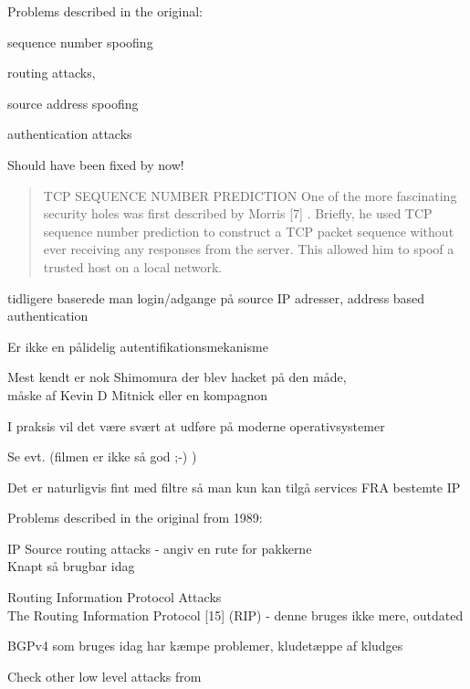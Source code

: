 \documentclass[Screen16to9,17pt]{foils}
\begin{document}
\begin{list1}
\item Problems described in the original:
\begin{list2}
\item sequence number spoofing
\item routing attacks,
\item source address spoofing
\item authentication attacks
\end{list2}
\end{list1}

\vskip 1cm
\centerline{\Large Should have been fixed by now!}


\vskip 5mm
\begin{quote}
TCP SEQUENCE NUMBER PREDICTION
One of the more fascinating security holes was first described by Morris [7] . Briefly, he used TCP
sequence number prediction to construct a TCP packet sequence without ever receiving any responses
from the server. This allowed him to spoof a trusted host on a local network.
\end{quote}

\begin{list1}
\item tidligere baserede man login/adgange på source IP adresser, address based authentication
\item Er ikke en pålidelig autentifikationsmekanisme
\item Mest kendt er nok Shimomura der blev hacket på den måde, \\
måske af Kevin D Mitnick eller en kompagnon
\item I praksis vil det være svært at udføre på moderne operativsystemer
\item Se evt.  (filmen er ikke så god ;-) )
\item Det er naturligvis fint med filtre så man kun kan tilgå services FRA bestemte IP
\end{list1}


\begin{list1}
\item Problems described in the original from 1989:
\begin{list2}
\item IP Source routing attacks - angiv en rute for pakkerne\\
Knapt så brugbar idag
\item Routing Information Protocol Attacks\\
The Routing Information Protocol [15] (RIP) - denne bruges ikke mere, outdated
\item BGPv4 som bruges idag har kæmpe problemer, kludetæppe af kludges
\end{list2}
\item Check other low level attacks from 
\end{list1}
\end{document}
